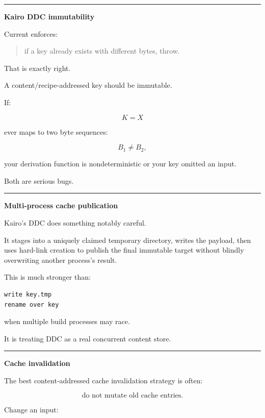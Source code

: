 \begin{center}\rule{0.5\linewidth}{0.5pt}\end{center}

\textbf{Kairo DDC immutability}

Current  enforces:

\begin{quote}
if a key already exists with different bytes, throw.
\end{quote}

That is exactly right.

A content/recipe-addressed key should be immutable.

If:

\[
K=X
\]

ever maps to two byte sequences:

\[
B_1\neq B_2,
\]

your derivation function is nondeterministic or your key omitted an input.

Both are serious bugs.

\begin{center}\rule{0.5\linewidth}{0.5pt}\end{center}

\textbf{Multi-process cache publication}

Kairo's DDC does something notably careful.

It stages into a uniquely claimed temporary directory, writes the payload, then uses hard-link creation to publish the final immutable target without blindly overwriting another process's result.

This is much stronger than:

\begin{verbatim}
write key.tmp
rename over key
\end{verbatim}

when multiple build processes may race.

It is treating DDC as a real concurrent content store.

\begin{center}\rule{0.5\linewidth}{0.5pt}\end{center}

\textbf{Cache invalidation}

The best content-addressed cache invalidation strategy is often:

\[
\boxed{
\text{do not mutate old cache entries}.
}
\]

Change an input:

